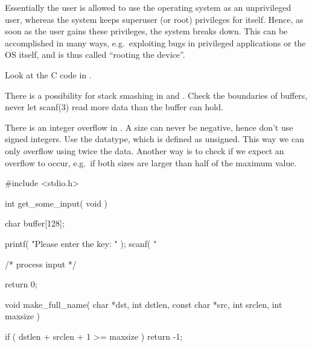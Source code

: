 \documentclass[svv,addpoints]{miunexam}
\begin{document}
\begin{questions}
\begin{solution}
    Essentially the user is allowed to use the operating system as an 
    unprivileged user, whereas the system keeps superuser (or root) privileges 
    for itself.
    Hence, as soon as the user gains these privileges, the system breaks down.
    This can be accomplished in many ways, e.g.\ exploiting bugs in privileged 
    applications or the OS itself, and is thus called ``rooting the device''.
  \end{solution}


  \question\label{q:stacksmash}
  Look at the C code in .
  \begin{solution}
    There is a possibility for stack smashing in  and 
    .
    Check the boundaries of buffers, never let scanf(3) read more data than the 
    buffer can hold.

    There is an integer overflow in .
    A size can never be negative, hence don't use signed integers.
    Use the  datatype, which is defined as unsigned.
    This way we can only overflow using twice the data.
    Another way is to check if we expect an overflow to occur, e.g.\ if both 
    sizes are larger than half of the maximum value.
  \end{solution}

  \begin{src}[float,caption={Some vulnerable C code.},label={lst:overrun}]
#include <stdio.h>

int
get_some_input( void )
{
  char buffer[128];

  printf( "Please enter the key: " );
  scanf( "%

  /* process input */

  return 0;
}

void
make_full_name( char *dst, int dstlen,
                const char *src, int srclen,
                int maxsize )
{
  if ( dstlen + srclen + 1 >= maxsize )
    return -1;

}
\end{src}
\end{questions}
\end{document}
